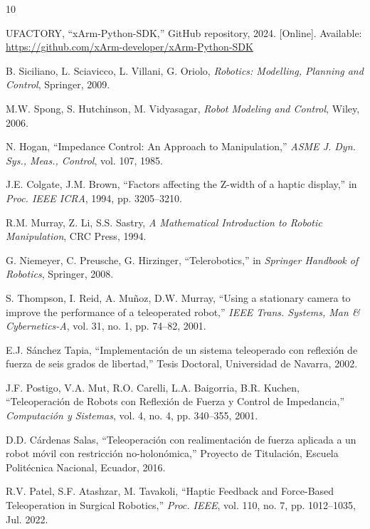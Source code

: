 \documentclass[journal,10pt,twoside]{IEEEtran}
\begin{document}
\begin{thebibliography}{10}

 UFACTORY, ``xArm-Python-SDK,'' GitHub repository, 2024. [Online]. Available: \url{https://github.com/xArm-developer/xArm-Python-SDK}

 B. Siciliano, L. Sciavicco, L. Villani, G. Oriolo, \textit{Robotics: Modelling, Planning and Control}, Springer, 2009.

 M.W. Spong, S. Hutchinson, M. Vidyasagar, \textit{Robot Modeling and Control}, Wiley, 2006.

 N. Hogan, ``Impedance Control: An Approach to Manipulation,'' \textit{ASME J. Dyn. Sys., Meas., Control}, vol. 107, 1985.

 J.E. Colgate, J.M. Brown, ``Factors affecting the Z-width of a haptic display,'' in \textit{Proc. IEEE ICRA}, 1994, pp. 3205--3210.

 R.M. Murray, Z. Li, S.S. Sastry, \textit{A Mathematical Introduction to Robotic Manipulation}, CRC Press, 1994.

 G. Niemeyer, C. Preusche, G. Hirzinger, ``Telerobotics,'' in \textit{Springer Handbook of Robotics}, Springer, 2008.

 S. Thompson, I. Reid, A. Mu\~noz, D.W. Murray, ``Using a stationary camera to improve the performance of a teleoperated robot,'' \textit{IEEE Trans. Systems, Man \& Cybernetics-A}, vol. 31, no. 1, pp. 74--82, 2001.

 E.J. Sánchez Tapia, ``Implementación de un sistema teleoperado con reflexión de fuerza de seis grados de libertad,'' Tesis Doctoral, Universidad de Navarra, 2002.

 J.F. Postigo, V.A. Mut, R.O. Carelli, L.A. Baigorria, B.R. Kuchen, ``Teleoperación de Robots con Reflexión de Fuerza y Control de Impedancia,'' \textit{Computación y Sistemas}, vol. 4, no. 4, pp. 340--355, 2001.

 D.D. Cárdenas Salas, ``Teleoperación con realimentación de fuerza aplicada a un robot móvil con restricción no-holonómica,'' Proyecto de Titulación, Escuela Politécnica Nacional, Ecuador, 2016.

 R.V. Patel, S.F. Atashzar, M. Tavakoli, ``Haptic Feedback and Force-Based Teleoperation in Surgical Robotics,'' \textit{Proc. IEEE}, vol. 110, no. 7, pp. 1012--1035, Jul. 2022.


\end{thebibliography}
\end{document}
